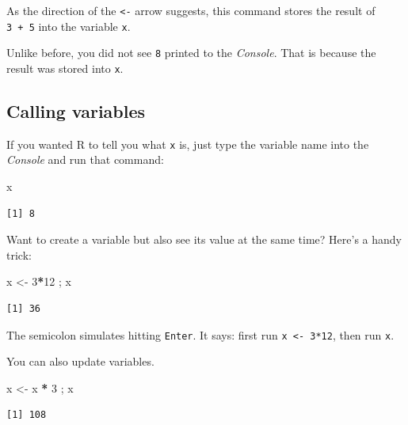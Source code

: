 \documentclass[
]{book}
\newenvironment{Shaded}{\begin{snugshade}}{\end{snugshade}}
\newcommand{\DecValTok}[1]{\textcolor[rgb]{0.00,0.00,0.81}{#1}}
\newcommand{\NormalTok}[1]{#1}
\newcommand{\OperatorTok}[1]{\textcolor[rgb]{0.81,0.36,0.00}{\textbf{#1}}}
\newcommand{\StringTok}[1]{\textcolor[rgb]{0.31,0.60,0.02}{#1}}
\begin{document}
As the direction of the \texttt{\textless{}-} arrow suggests, this command stores the result of \texttt{3\ +\ 5} into the variable \texttt{x}.

Unlike before, you did not see \texttt{8} printed to the \emph{Console}. That is because the result was stored into \texttt{x}.

\hypertarget{calling-variables}{%
\subsection*{Calling variables}\label{calling-variables}}

If you wanted R to tell you what \texttt{x} is, just type the variable name into the \emph{Console} and run that command:

\begin{Shaded}
\begin{Highlighting}[]
\NormalTok{x}
\end{Highlighting}
\end{Shaded}

\begin{verbatim}
[1] 8
\end{verbatim}

Want to create a variable but also see its value at the same time? Here's a handy trick:

\begin{Shaded}
\begin{Highlighting}[]
\NormalTok{x <-}\StringTok{ }\DecValTok{3}\OperatorTok{*}\DecValTok{12}\NormalTok{ ; x}
\end{Highlighting}
\end{Shaded}

\begin{verbatim}
[1] 36
\end{verbatim}

The semicolon simulates hitting \texttt{Enter}. It says: first run \texttt{x\ \textless{}-\ 3*12}, then run \texttt{x}.

You can also update variables.

\begin{Shaded}
\begin{Highlighting}[]
\NormalTok{x <-}\StringTok{ }\NormalTok{x }\OperatorTok{*}\StringTok{ }\DecValTok{3}\NormalTok{ ; x}
\end{Highlighting}
\end{Shaded}

\begin{verbatim}
[1] 108
\end{verbatim}
\end{document}
